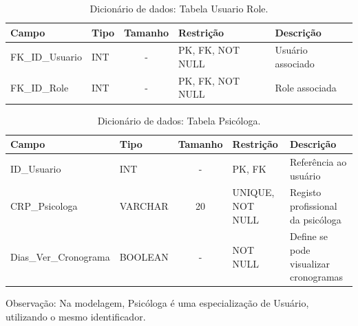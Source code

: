 \begin{table}[H]
    \centering
    \ABNTEXfontereduzida
    \caption[Dicionário de Dados - Tabela Usuario Role]{Dicionário de dados: Tabela Usuario Role.}
    \label{tab-tb-usuario-role}
    \begin{tabular}{p{3.5cm}|p{2cm}|c|p{3.5cm}|p{4cm}}
    \textbf{Campo} & \textbf{Tipo} & \textbf{Tamanho} & \textbf{Restrição} & \textbf{Descrição} \\
    \hline
    FK\_ID\_Usuario & INT & - & PK, FK, NOT NULL & Usuário associado \\
    \hline
    FK\_ID\_Role & INT & - & PK, FK, NOT NULL & Role associada \\
    \end{tabular}
\end{table}

\begin{table}[H]
    \centering
    \ABNTEXfontereduzida
    \caption[Dicionário de Dados - Tabela Psicóloga]{Dicionário de dados: Tabela Psicóloga.}
    \label{tab-tb-psicologa}
    \begin{tabular}{p{3.5cm}|p{2cm}|c|p{3.5cm}|p{4cm}}
    \textbf{Campo} & \textbf{Tipo} & \textbf{Tamanho} & \textbf{Restrição} & \textbf{Descrição} \\
    \hline
    ID\_Usuario & INT & - & PK, FK & Referência ao usuário \\
    \hline
    CRP\_Psicologa & VARCHAR & 20 & UNIQUE, NOT NULL & Registo profissional da psicóloga \\
    \hline
    Dias\_Ver\_Cronograma & BOOLEAN & - & NOT NULL & Define se pode visualizar cronogramas \\
    \end{tabular}
\end{table}

Observação: Na modelagem, Psicóloga é uma especialização de Usuário, utilizando o mesmo identificador.

